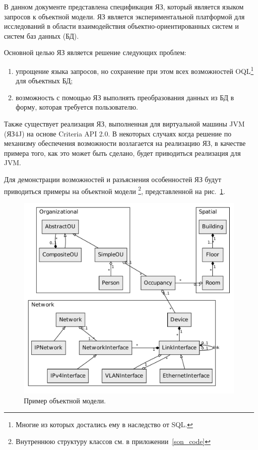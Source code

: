 В данном документе представлена спецификация ЯЗ, который 
является языком запросов к объектной модели.%
ЯЗ является экспериментальной платформой для исследований в области
взаимодействия объектно-ориентированных систем и систем баз данных (БД).

Основной целью ЯЗ является решение следующих проблем:
\begin{enumerate}
    \item упрощение языка запросов, но сохранение при этом всех возможностей
    OQL\footnote{Многие из которых достались ему в наследство от SQL.} для объектных БД;
    \item возможность с помощью ЯЗ выполнять преобразования
данных из БД в форму, которая требуется пользователю.
\end{enumerate}

Также существует реализация ЯЗ, выполненная  
для виртуальной машины JVM (ЯЗ4J) на основе Criteria API 2.0.%
В некоторых случаях когда решение по
механизму обеспечения возможности возлагается на реализацию ЯЗ, 
в качестве примера того, как это может быть сделано, будет приводиться реализация для JVM.

Для демонстрации возможностей и разъяснения особенностей ЯЗ будут приводиться
примеры на объектной модели
\footnote{Внутреннюю структуру классов см. в приложении~\ref{son_code}}, представленной на рис.~\ref{fig:son-model}.

\begin{figure}[hbt]
  \centering
  \includegraphics[scale=0.7]{figures/son}
  \caption{Пример объектной модели.}%
  \label{fig:son-model}
\end{figure}

